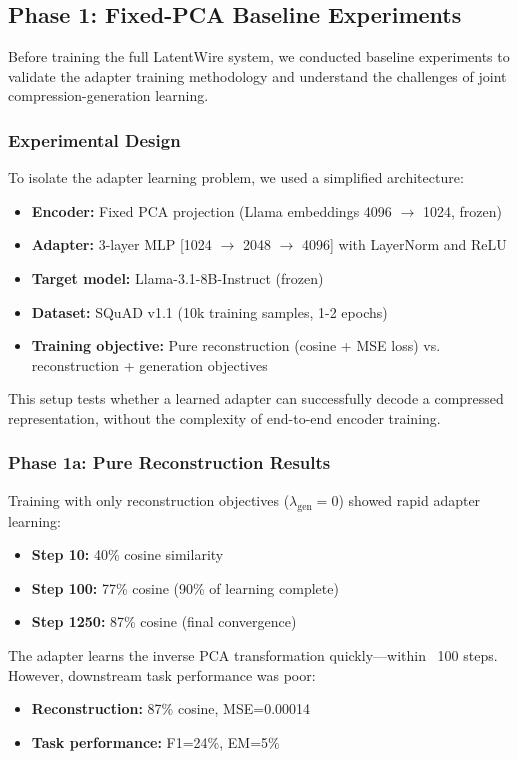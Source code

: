 \documentclass{article}
\begin{document}
\subsection{Phase 1: Fixed-PCA Baseline Experiments}

Before training the full LatentWire system, we conducted baseline experiments to validate the adapter training methodology and understand the challenges of joint compression-generation learning.

\subsubsection{Experimental Design}

To isolate the adapter learning problem, we used a simplified architecture:
\begin{itemize}
\item \textbf{Encoder:} Fixed PCA projection (Llama embeddings 4096 $\rightarrow$ 1024, frozen)
\item \textbf{Adapter:} 3-layer MLP [1024 $\rightarrow$ 2048 $\rightarrow$ 4096] with LayerNorm and ReLU
\item \textbf{Target model:} Llama-3.1-8B-Instruct (frozen)
\item \textbf{Dataset:} SQuAD v1.1 (10k training samples, 1-2 epochs)
\item \textbf{Training objective:} Pure reconstruction (cosine + MSE loss) vs. reconstruction + generation objectives
\end{itemize}

This setup tests whether a learned adapter can successfully decode a compressed representation, without the complexity of end-to-end encoder training.

\subsubsection{Phase 1a: Pure Reconstruction Results}

Training with only reconstruction objectives ($\lambda_{\text{gen}} = 0$) showed rapid adapter learning:
\begin{itemize}
\item \textbf{Step 10:} 40\% cosine similarity
\item \textbf{Step 100:} 77\% cosine (90\% of learning complete)
\item \textbf{Step 1250:} 87\% cosine (final convergence)
\end{itemize}

The adapter learns the inverse PCA transformation quickly—within ~100 steps. However, downstream task performance was poor:
\begin{itemize}
\item \textbf{Reconstruction:} 87\% cosine, MSE=0.00014
\item \textbf{Task performance:} F1=24\%, EM=5\%
\end{itemize}
\end{document}
